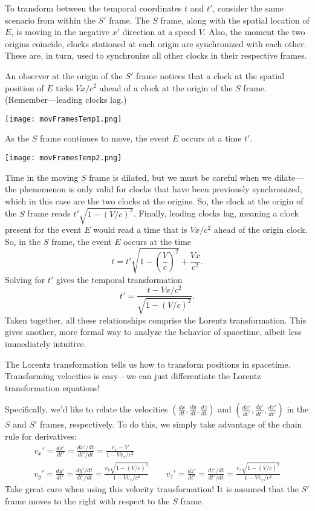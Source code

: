 \documentclass[../p023main.tex]{subfiles}
\begin{document}
To transform between the temporal coordinates $t$ and $t'$, consider the same scenario from within the $S'$ frame.
The $S$ frame, along with the spatial location of $E$, is moving in the negative $x'$ direction at a speed $V$.
Also, the moment the two origins coincide, clocks stationed at each origin are synchronized with each other.
These are, in turn, used to synchronize all other clocks in their respective frames.

An observer at the origin of the $S'$ frame notices that a clock at the spatial position of $E$ ticks $Vx / c^2$ ahead of a clock at the origin of the $S$ frame.
(Remember---leading clocks lag.)
\begin{center}
    \texttt{[image: movFramesTemp1.png]}
\end{center}
As the $S$ frame continues to move, the event $E$ occurs at a time $t'$.
\begin{center}
    \texttt{[image: movFramesTemp2.png]}
\end{center}
Time in the moving $S$ frame is dilated, but we must be careful when we dilate---the phenomenon is only valid for clocks that have been previously synchronized, which in this case are the two clocks at the origins.
So, the clock at the origin of the $S$ frame reads $t' \sqrt{1 - \left( V / c \right)^2}$.
Finally, leading clocks lag, meaning a clock present for the event $E$ would read a time that is $Vx / c^2$ ahead of the origin clock.
So, in the $S$ frame, the event $E$ occurs at the time
\[ t = t' \sqrt{1 - \left( \frac{V}{c} \right)^2} + \frac{Vx}{c^2}. \]
Solving for $t'$ gives the temporal transformation
\[ t' = \frac{t - Vx / c^2}{\sqrt{1 - \left( V / c \right)^2}}. \]
Taken together, all these relationships comprise the Lorentz transformation.
This gives another, more formal way to analyze the behavior of spacetime, albeit less immediately intuitive.

The Lorentz transformation tells us how to transform positions in spacetime.
Transforming velocities is easy---we can just differentiate the Lorentz transformation equations!

Specifically, we'd like to relate the velocities $\left( \frac{dx}{dt}, \frac{dy}{dt}, \frac{dz}{dt} \right)$ and $\left( \frac{dx'}{dt'}, \frac{dy'}{dt'}, \frac{dz'}{dt'} \right)$ in the $S$ and $S'$ frames, respectively.
To do this, we simply take advantage of the chain rule for derivatives:
\begin{gather*}
    v_x' = \frac{dx'}{dt'} = \frac{dx'/dt}{dt'/dt} = \frac{v_x - V}{1 - Vv_x / c^2} \\
    v_y' = \frac{dy'}{dt'} = \frac{dy'/dt}{dt'/dt} = \frac{v_y\sqrt{1 - \left( V / c \right)^2}}{1 - Vv_x / c^2} \qquad
    v_z' = \frac{dz'}{dt'} = \frac{dz'/dt}{dt'/dt} = \frac{v_z\sqrt{1 - \left( V / c \right)^2}}{1 - Vv_x / c^2}
\end{gather*}
Take great care when using this velocity transformation!
It is assumed that the $S'$ frame moves to the right with respect to the $S$ frame.
\end{document}

